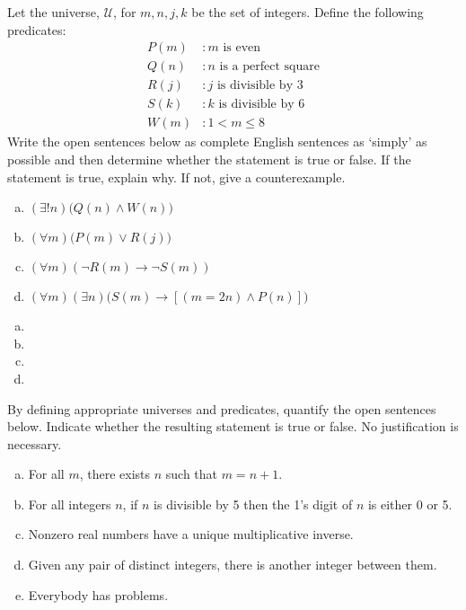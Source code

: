 \documentclass[11pt,letterpaper]{article}
\begin{document}

 Let the universe, $\mathcal{U}$, for $m, n, j, k$ be the set of integers. Define the following predicates:
	\[
	\begin{aligned}
	P(m) &\colon m \text{ is even} \\
	Q(n) &\colon n \text{ is a perfect square} \\
	R(j) &\colon j \text{ is divisible by 3} \\
	S(k) &\colon k \text{ is divisible by 6} \\
	W(m) &\colon 1 < m \leq 8
	\end{aligned}
	\]
Write the open sentences below as complete English sentences as `simply' as possible and then determine whether the statement is true or false. If the statement is true, explain why. If not, give a counterexample. 
	\begin{enumerate}[(a)]
	\item $(\exists! n) \big( Q(n) \wedge W(n) \big)$ 
	\item $(\forall m) \big( P(m) \vee R(j) \big)$ 
	\item $(\forall m) (\neg R(m) \to \neg S(m))$ 
	\item $(\forall m) (\exists n) \big( S(m) \to [(m= 2n) \wedge P(n)] \big)$ 
	\end{enumerate} \pspace

\sol
\begin{enumerate}[(a)]
\item 
\item 
\item 
\item 
\end{enumerate}



\newpage



 By defining appropriate universes and predicates, quantify the open sentences below. Indicate whether the resulting statement is true or false. No justification is necessary. 
	\begin{enumerate}[(a)]
	\item For all $m$, there exists $n$ such that $m= n + 1$.
	\item For all integers $n$, if $n$ is divisible by 5 then the 1's digit of $n$ is either 0 or 5.
	\item Nonzero real numbers have a unique multiplicative inverse. 
	\item Given any pair of distinct integers, there is another integer between them.
	\item Everybody has problems. 
	\end{enumerate} \pspace
\end{document}
